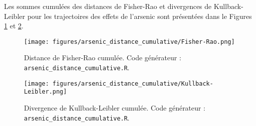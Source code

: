 Les sommes cumulées des distances de Fisher-Rao et divergences de Kullback-Leibler pour les trajectoires des effets de l'arsenic sont présentées dans le Figures \ref{fig:arsenic_distance_cumulative:Fisher-Rao} et \ref{fig:arsenic_distance_cumulative:Kullback-Leibler}.

\begin{figure}[H]
	\centering
	\texttt{[image: figures/arsenic\_distance\_cumulative/Fisher-Rao.png]}
	\caption{Distance de Fisher-Rao cumulée. Code générateur : \texttt{arsenic\_distance\_cumulative.R}.}
	\label{fig:arsenic_distance_cumulative:Fisher-Rao}
\end{figure}

\begin{figure}[H]
	\centering
	\texttt{[image: figures/arsenic\_distance\_cumulative/Kullback-Leibler.png]}
	\caption{Divergence de Kullback-Leibler cumulée. Code générateur : \texttt{arsenic\_distance\_cumulative.R}.}
	\label{fig:arsenic_distance_cumulative:Kullback-Leibler}
\end{figure}